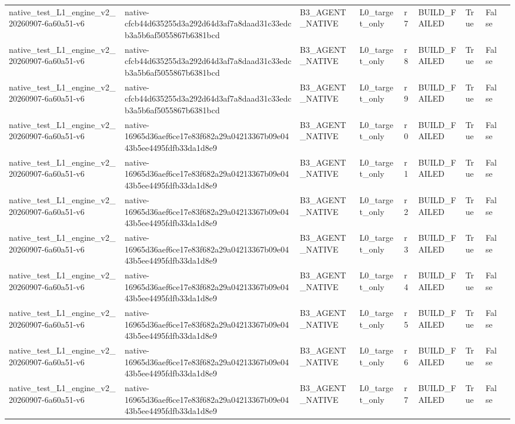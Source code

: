 \begin{tabular}{lllllllll}
native\_test\_L1\_engine\_v2\_20260907-6a60a51-v6 & native-cfcb44d635255d3a292d64d3af7a8daad31c33edcb3a5b6af5055867b6381bcd & B3\_AGENT\_NATIVE & L0\_target\_only & r7 & BUILD\_FAILED & True & False &  \\
native\_test\_L1\_engine\_v2\_20260907-6a60a51-v6 & native-cfcb44d635255d3a292d64d3af7a8daad31c33edcb3a5b6af5055867b6381bcd & B3\_AGENT\_NATIVE & L0\_target\_only & r8 & BUILD\_FAILED & True & False &  \\
native\_test\_L1\_engine\_v2\_20260907-6a60a51-v6 & native-cfcb44d635255d3a292d64d3af7a8daad31c33edcb3a5b6af5055867b6381bcd & B3\_AGENT\_NATIVE & L0\_target\_only & r9 & BUILD\_FAILED & True & False &  \\
native\_test\_L1\_engine\_v2\_20260907-6a60a51-v6 & native-16965d36aef6ce17e83f682a29a04213367b09e0443b5ee4495fdfb33da1d8e9 & B3\_AGENT\_NATIVE & L0\_target\_only & r0 & BUILD\_FAILED & True & False &  \\
native\_test\_L1\_engine\_v2\_20260907-6a60a51-v6 & native-16965d36aef6ce17e83f682a29a04213367b09e0443b5ee4495fdfb33da1d8e9 & B3\_AGENT\_NATIVE & L0\_target\_only & r1 & BUILD\_FAILED & True & False &  \\
native\_test\_L1\_engine\_v2\_20260907-6a60a51-v6 & native-16965d36aef6ce17e83f682a29a04213367b09e0443b5ee4495fdfb33da1d8e9 & B3\_AGENT\_NATIVE & L0\_target\_only & r2 & BUILD\_FAILED & True & False &  \\
native\_test\_L1\_engine\_v2\_20260907-6a60a51-v6 & native-16965d36aef6ce17e83f682a29a04213367b09e0443b5ee4495fdfb33da1d8e9 & B3\_AGENT\_NATIVE & L0\_target\_only & r3 & BUILD\_FAILED & True & False &  \\
native\_test\_L1\_engine\_v2\_20260907-6a60a51-v6 & native-16965d36aef6ce17e83f682a29a04213367b09e0443b5ee4495fdfb33da1d8e9 & B3\_AGENT\_NATIVE & L0\_target\_only & r4 & BUILD\_FAILED & True & False &  \\
native\_test\_L1\_engine\_v2\_20260907-6a60a51-v6 & native-16965d36aef6ce17e83f682a29a04213367b09e0443b5ee4495fdfb33da1d8e9 & B3\_AGENT\_NATIVE & L0\_target\_only & r5 & BUILD\_FAILED & True & False &  \\
native\_test\_L1\_engine\_v2\_20260907-6a60a51-v6 & native-16965d36aef6ce17e83f682a29a04213367b09e0443b5ee4495fdfb33da1d8e9 & B3\_AGENT\_NATIVE & L0\_target\_only & r6 & BUILD\_FAILED & True & False &  \\
native\_test\_L1\_engine\_v2\_20260907-6a60a51-v6 & native-16965d36aef6ce17e83f682a29a04213367b09e0443b5ee4495fdfb33da1d8e9 & B3\_AGENT\_NATIVE & L0\_target\_only & r7 & BUILD\_FAILED & True & False &  \\

\end{tabular}

